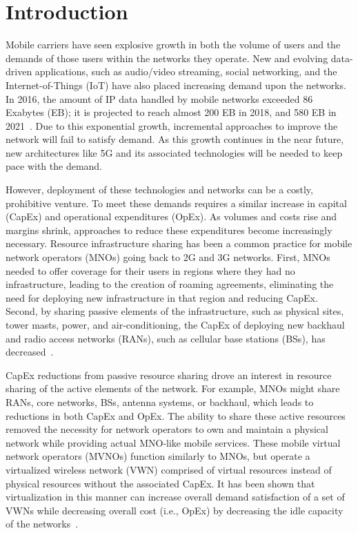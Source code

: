 \documentclass[12pt,dvipsnames]{report}
\begin{document}
\pagestyle{myheadings}

\iftrue
\chapter{Introduction} \label{ch:intro}

Mobile carriers have seen explosive growth in both the volume of users and the demands of those users within the networks they operate.  New and evolving data-driven applications, such as audio/video streaming, social networking, and the Internet-of-Things (IoT) have also placed increasing demand upon the networks.  In 2016, the amount of IP data handled by mobile networks exceeded 86 Exabytes (EB); it is projected to reach almost 200 EB in 2018, and 580 EB in 2021~\cite{ciscoVNI2017}.  Due to this exponential growth, incremental approaches to improve the network will fail to satisfy demand.  As this growth continues in the near future, new architectures like 5G and its associated technologies will be needed to keep pace with the demand.

However, deployment of these technologies and networks can be a costly, prohibitive venture.  To meet these demands requires a similar increase in capital (CapEx) and operational expenditures (OpEx).  As volumes and costs rise and margins shrink, approaches to reduce these expenditures become increasingly necessary.  Resource infrastructure sharing has been a common practice for mobile network operators (MNOs) going back to 2G and 3G networks.  First, MNOs needed to offer coverage for their users in regions where they had no infrastructure, leading to the creation of roaming agreements, eliminating the need for deploying new infrastructure in that region and reducing CapEx.  Second, by sharing passive elements of the infrastructure, such as physical sites, tower masts, power, and air-conditioning, the CapEx of deploying new backhaul and radio access networks (RANs), such as cellular base stations (BSs), has decreased~\cite{1421931}.

CapEx reductions from passive resource sharing drove an interest in resource sharing of the active elements of the network.  For example, MNOs might share RANs, core networks, BSs, antenna systems, or backhaul, which leads to reductions in both CapEx and OpEx.  The ability to share these active resources removed the necessity for network operators to own and maintain a physical network while providing actual MNO-like mobile services.  These mobile virtual network operators (MVNOs) function similarly to MNOs, but operate a virtualized wireless network (VWN) comprised of virtual resources instead of physical resources without the associated CapEx.  It has been shown that virtualization in this manner can increase overall demand satisfaction of a set of VWNs while decreasing overall cost (i.e., OpEx) by decreasing the idle capacity of the networks~\cite{MJ_CCNC_16}.
\end{document}
